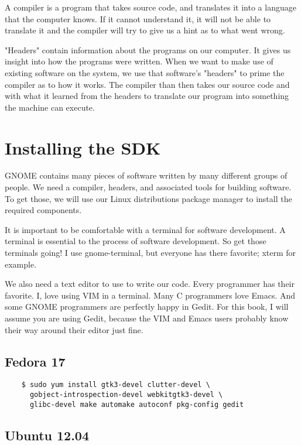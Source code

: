 A compiler is a program that takes source code, and translates it into a
language that the computer knows. If it cannot understand it, it will not be
able to translate it and the compiler will try to give us a hint as to what
went wrong.

"Headers" contain information about the programs on our computer.  It gives us
insight into how the programs were written. When we want to make use of
existing software on the system, we use that software's "headers" to prime the
compiler as to how it works. The compiler than then takes our source code and
with what it learned from the headers to translate our program into something
the machine can execute.


\section{Installing the SDK}

GNOME contains many pieces of software written by many different groups of
people. We need a compiler, headers, and associated tools for building
software. To get those, we will use our Linux distributions package manager to
install the required components.

It is important to be comfortable with a terminal for software development. A
terminal is essential to the process of software development. So get those
terminals going! I use gnome-terminal, but everyone has there favorite; xterm
for example.

We also need a text editor to use to write our code. Every programmer has their
favorite. I, love using VIM in a terminal. Many C programmers love Emacs. And
some GNOME programmers are perfectly happy in Gedit. For this book, I will
assume you are using Gedit, because the VIM and Emacs users probably know their
way around their editor just fine.


\subsection{Fedora 17}

\begin{Verbatim}
    $ sudo yum install gtk3-devel clutter-devel \
      gobject-introspection-devel webkitgtk3-devel \
      glibc-devel make automake autoconf pkg-config gedit
\end{Verbatim}


\subsection{Ubuntu 12.04}

